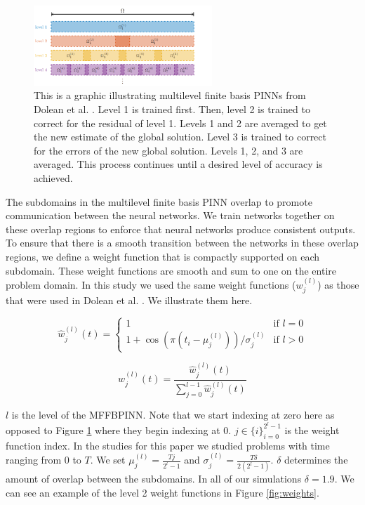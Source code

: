\documentclass[12pt]{article}
\begin{document}
\begin{figure}[t]
\center
\includegraphics[width = 0.6\textwidth]{imgs/domain_decomp2}
\caption{This is a graphic illustrating multilevel finite basis PINNs from Dolean et al. \cite{fbpinns}.  Level 1 is trained first. Then, level 2 is trained to correct for the residual of level 1. Levels 1 and 2 are averaged to get the new estimate of the global solution. Level 3 is trained to correct for the errors of the new global solution. Levels 1, 2, and 3 are averaged. This process continues until a desired level of accuracy is achieved.}
\label{fig:fbpinn}
\end{figure} 

\par The subdomains in the multilevel finite basis PINN overlap to promote communication between the neural networks. We train networks together on these overlap regions to enforce that neural networks produce consistent outputs. To ensure that there is a smooth transition between the networks in these overlap regions, we define a weight function that is compactly supported on each subdomain. These weight functions are smooth and sum to one on the entire problem domain. In this study we used the same weight functions ($w_{j}^{(l)}$) as those that were used in Dolean et al. \cite{fbpinns}. We illustrate them here.

\begin{equation}
\hat{w}_j^{(l)}(t) =
    \begin{cases}
        1 & \text{if } l = 0\\
        1 + \cos(\pi(t_i - \mu_{j}^{(l)}))/\sigma_{j}^{(l)}& \text{if } l>0
    \end{cases}
\end{equation}

\begin{equation}
w_j^{(l)}(t) = \frac{\hat{w}_j^{(l)}(t)}{\sum_{j=0}^{l-1} \hat{w}_j^{(l)}(t)}
\end{equation}

\par  $l$ is the level of the MFFBPINN. Note that we start indexing at zero here as opposed to Figure \ref{fig:fbpinn} where they begin indexing at 0. $j \in \{i\}_{i=0}^{2^l-1}$ is the weight function index. In the studies for this paper we studied problems with time ranging from $0$ to $T$. We set $\mu_{j}^{(l)} = \frac{Tj}{2^l-1}$ and $\sigma_{j}^{(l)} = \frac{T\delta}{2(2^l-1)}$. $\delta$ determines the amount of overlap between the subdomains. In all of our simulations $\delta = 1.9$. We can see an example of the level 2 weight functions in Figure \ref{fig:weights}.
\end{document}
